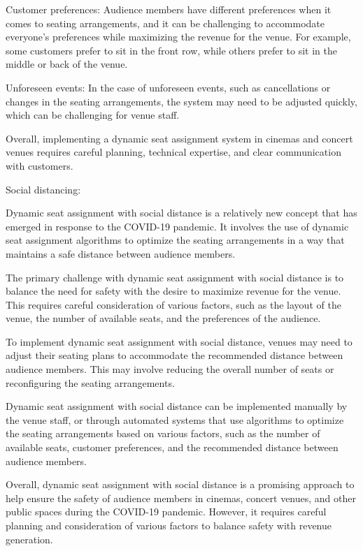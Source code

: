 Customer preferences: Audience members have different preferences when it comes to seating arrangements, and it can be challenging to accommodate everyone's preferences while maximizing the revenue for the venue. For example, some customers prefer to sit in the front row, while others prefer to sit in the middle or back of the venue.

Unforeseen events: In the case of unforeseen events, such as cancellations or changes in the seating arrangements, the system may need to be adjusted quickly, which can be challenging for venue staff.

Overall, implementing a dynamic seat assignment system in cinemas and concert venues requires careful planning, technical expertise, and clear communication with customers.

Social distancing:

Dynamic seat assignment with social distance is a relatively new concept that has emerged in response to the COVID-19 pandemic. It involves the use of dynamic seat assignment algorithms to optimize the seating arrangements in a way that maintains a safe distance between audience members.

The primary challenge with dynamic seat assignment with social distance is to balance the need for safety with the desire to maximize revenue for the venue. This requires careful consideration of various factors, such as the layout of the venue, the number of available seats, and the preferences of the audience.

To implement dynamic seat assignment with social distance, venues may need to adjust their seating plans to accommodate the recommended distance between audience members. This may involve reducing the overall number of seats or reconfiguring the seating arrangements.

Dynamic seat assignment with social distance can be implemented manually by the venue staff, or through automated systems that use algorithms to optimize the seating arrangements based on various factors, such as the number of available seats, customer preferences, and the recommended distance between audience members.

Overall, dynamic seat assignment with social distance is a promising approach to help ensure the safety of audience members in cinemas, concert venues, and other public spaces during the COVID-19 pandemic. However, it requires careful planning and consideration of various factors to balance safety with revenue generation.



